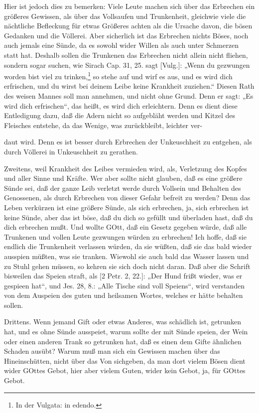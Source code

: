 Hier ist jedoch dies zu bemerken: Viele Leute machen sich über das Erbrechen ein größeres Gewissen, als über das Vollsaufen und Trunkenheit, gleichwie viele die nächtliche Befleckung für etwas Größeres achten als die Ursache davon, die bösen Gedanken und die Völlerei. Aber sicherlich ist das Erbrechen nichts Böses, noch auch jemals eine Sünde, da es sowohl wider Willen als auch unter Schmerzen statt hat. Deshalb sollen die Trunkenen das Erbrechen nicht allein nicht fliehen, sondern sogar suchen, wie Sirach Cap. 31, 25. sagt [Vulg.]: „Wenn du gezwungen worden bist viel zu trinken,\footnote{In der Vulgata: in edendo.} so stehe auf und wirf es aus, und es wird dich erfrischen, und du wirst bei deinem Leibe keine Krankheit zuziehen.“ Diesen Rath des weisen Mannes soll man annehmen, und nicht ohne Grund. Denn er sagt: „Es wird dich erfrischen“, das heißt, es wird dich erleichtern. Denn es dient diese Entledigung dazu, daß die Adern nicht so aufgebläht werden und Kitzel des Fleisches entstehe, da das Wenige, was zurückbleibt, leichter ver-

daut wird. Denn es ist besser durch Erbrechen der Unkeuschheit zu entgehen, als durch Völlerei in Unkeuschheit zu gerathen.

Zweitens, weil Krankheit des Leibes vermieden wird, als, Verletzung des Kopfes und aller Sinne und Kräfte. Wer aber sollte nicht glauben, daß es eine größere Sünde sei, daß der ganze Leib verletzt werde durch Vollsein und Behalten des Genossenen, als durch Erbrechen von dieser Gefahr befreit zu werden? Denn das Leben verkürzen ist eine größere Sünde, als sich erbrechen, ja, sich erbrechen ist keine Sünde, aber das ist böse, daß du dich so gefüllt und überladen hast, daß du dich erbrechen mußt. Und wollte GOtt, daß ein Gesetz gegeben würde, daß alle Trunkenen und vollen Leute gezwungen würden zu erbrechen! Ich hoffe, daß sie endlich die Trunkenheit verlassen würden, da sie wüßten, daß sie das bald wieder ausspien müßten, was sie tranken. Wiewohl sie auch bald das Wasser lassen und zu Stuhl gehen müssen, so kehren sie sich doch nicht daran. Daß aber die Schrift bisweilen das Speien straft, als [2 Petr. 2, 22.]: „Der Hund frißt wieder, was er gespieen hat“, und Jes. 28, 8.: „Alle Tische sind voll Speiens“, wird verstanden von dem Auspeien des guten und heilsamen Wortes, welches er hätte behalten sollen.

Drittens. Wenn jemand Gift oder etwas Anderes, was schädlich ist, getrunken hat, und es ohne Sünde ausspeiet, warum sollte der mit Sünde speien, der Wein oder einen anderen Trank so getrunken hat, daß es einen dem Gifte ähnlichen Schaden ausübt? Warum muß man sich ein Gewissen machen über das Hineinschütten, nicht über das Von sichgeben, da man dort vielem Bösen dient wider GOttes Gebot, hier aber vielem Guten, wider kein Gebot, ja, für GOttes Gebot.

